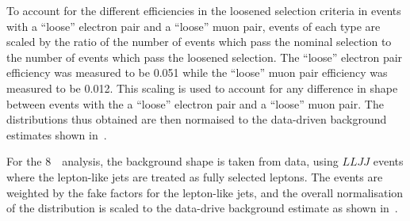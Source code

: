To account for the different efficiencies in the loosened selection criteria in
events with a ``loose'' electron pair and a ``loose'' muon pair, events of each
type are scaled by the ratio of the number of events which pass the nominal
selection to the number of events which pass the loosened selection.  
The ``loose'' electron pair efficiency was measured to be 0.051
while the ``loose'' muon pair efficiency  was measured to be 0.012.  This
scaling is used to account for any difference in shape between events with the
a ``loose'' electron pair and a ``loose'' muon pair.  The distributions thus
obtained are then normaised to the data-driven
background estimates shown in~. 

For the 8~\tev\ analysis, the background shape is taken from data, using $LLJJ$
events where the lepton-like jets are treated as fully selected leptons.  The
events are weighted by the fake factors for the lepton-like jets, and the
overall normalisation of the distribution is scaled to the data-drive background
estimate as shown in~.  

